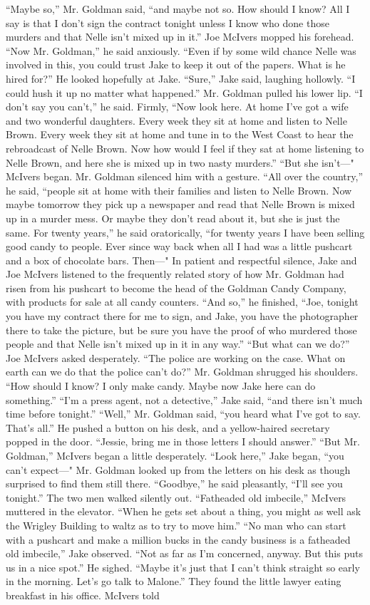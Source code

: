 \documentclass{novel}
\begin{document}
“Maybe so,” Mr. Goldman said, “and maybe not so. How should I know? All I say is that I don’t sign the contract tonight unless I know who done those murders and that Nelle isn’t mixed up in it.” Joe McIvers mopped his forehead. “Now Mr. Goldman,” he said anxiously. “Even if by some wild chance Nelle was involved in this, you could trust Jake to keep it out of the papers. What is he hired for?” He looked hopefully at Jake. “Sure,” Jake said, laughing hollowly. “I could hush it up no matter what happened.” Mr. Goldman pulled his lower lip. “I don’t say you can’t,” he said. Firmly, “Now look here. At home I've got a wife and two wonderful daughters. Every week they sit at home and listen to Nelle Brown. Every week they sit at home and tune in to the West Coast to hear the rebroadcast of Nelle Brown. Now how would I feel if they sat at home listening to Nelle Brown, and here she is mixed up in two nasty murders.” “But she isn’t—" McIvers began. Mr. Goldman silenced him with a gesture. “All over the country,” he said, “people sit at home with their families and listen to Nelle Brown. Now maybe tomorrow they pick up a newspaper and read that Nelle Brown is mixed up in a murder mess. Or maybe they don’t read about it, but she is just the same. For twenty years,” he said oratorically, “for twenty years I have been selling good candy to people. Ever since way back when all I had was a little pushcart and a box of chocolate bars. Then—" In patient and respectful silence, Jake and Joe McIvers listened to the frequently related story of how Mr. Goldman had risen from his pushcart to become the head of the Goldman Candy Company, with products for sale at all candy counters. “And so,” he finished, “Joe, tonight you have my contract there for me to sign, and Jake, you have the photographer there to take the picture, but be sure you have the proof of who murdered those people and that Nelle isn’t mixed up in it in any way.” “But what can we do?” Joe McIvers asked desperately. “The police are working on the case. What on earth can we do that the police can’t do?” Mr. Goldman shrugged his shoulders. “How should I know? I only make candy. Maybe now Jake here can do something.” “I’m a press agent, not a detective,” Jake said, “and there isn’t much time before tonight.” “Well,” Mr. Goldman said, “you heard what I've got to say. That’s all.” He pushed a button on his desk, and a yellow-haired secretary popped in the door. “Jessie, bring me in those letters I should answer.” “But Mr. Goldman,” McIvers began a little desperately. “Look here,” Jake began, “you can’t expect—" Mr. Goldman looked up from the letters on his desk as though surprised to find them still there. “Goodbye,” he said pleasantly, “I’ll see you tonight.” The two men walked silently out. “Fatheaded old imbecile,” McIvers muttered in the elevator. “When he gets set about a thing, you might as well ask the Wrigley Building to waltz as to try to move him.” “No man who can start with a pushcart and make a million bucks in the candy business is a fatheaded old imbecile,” Jake observed. “Not as far as I’m concerned, anyway. But this puts us in a nice spot.” He sighed. “Maybe it’s just that I can’t think straight so early in the morning. Let’s go talk to Malone.” They found the little lawyer eating breakfast in his office. McIvers told 
\end{document}
